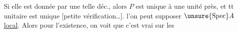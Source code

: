 Si elle est donnée par une telle déc., alors $P$ est unique à une unité près, et tt  unitaire est unique
\deleted{[\unsure{NB.}\quad\unsure{faut}}
[petite vérification\ldots]. 
 
 l'on peut supposer $\unsure{\operatorname{Spec}} A$ \uline{local}. Alors pour l'existence, on voit que c'est vrai sur les


